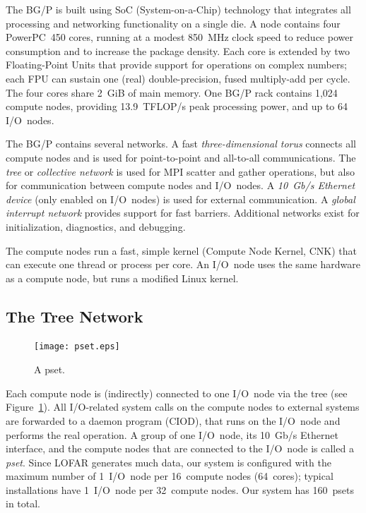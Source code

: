 \documentclass[journal]{IEEEtran}
\begin{document}


The BG/P is built using SoC (System-on-a-Chip) technology that integrates
all processing and networking functionality on a single die.
A node contains four PowerPC~450 cores, running at a modest 850~MHz clock
speed to reduce power consumption and to increase the package density.
Each core is extended by two Floating-Point Units that provide support for
operations on complex numbers; each FPU can sustain one (real) double-precision,
fused multiply-add per cycle.
The four cores share 2~GiB of main memory.
One BG/P rack contains 1,024 compute nodes, providing 13.9~TFLOP/s peak
processing power, and up to 64 I/O~nodes.

The BG/P contains several networks.
A fast \emph{three-dimensional torus\/} connects all compute nodes and is used
for point-to-point and all-to-all communications.
The \emph{tree\/} or \emph{collective network\/} is used for MPI scatter and
gather operations, but also for communication between compute nodes and
I/O~nodes.
A \emph{10~Gb/s Ethernet device\/} (only enabled on I/O~nodes) is used for
external communication.
A \emph{global interrupt network\/} provides support for fast barriers.
Additional networks exist for initialization, diagnostics, and debugging.

The compute nodes run a fast, simple kernel (Compute Node Kernel, CNK) that
can execute one thread or process per core.
An I/O~node uses the same hardware as a compute node, but runs a modified
Linux kernel.


\subsection{The Tree Network}

\begin{figure}[h]
\texttt{[image: pset.eps]}
\caption{A pset.}
\label{fig:pset}
\end{figure}

Each compute node is (indirectly) connected to one I/O~node via the tree
(see Figure~\ref{fig:pset}).
All I/O-related system calls on the compute nodes to external systems are
forwarded to a daemon program (CIOD), that runs on the
I/O~node and performs the real operation.
A group of one I/O~node, its 10~Gb/s Ethernet interface, and the compute
nodes that are connected to the I/O~node is called a \emph{pset}.
Since LOFAR generates much data, our system is configured with
the maximum number of 1~I/O~node per 16~compute nodes (64~cores); typical
installations have 1~I/O~node per 32~compute nodes.
Our system has 160~psets in total.
\end{document}
